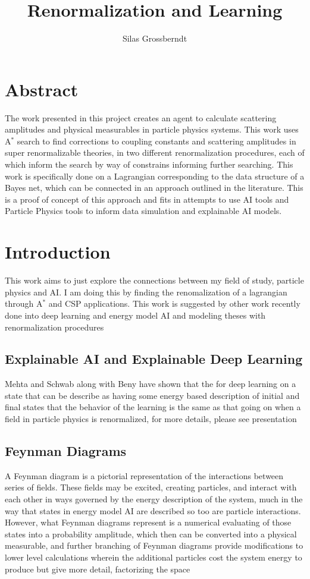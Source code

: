 \documentclass{article}
\author{Silas Grossberndt}
\title{Renormalization and Learning}
\begin{document}
\maketitle
\section*{Abstract}
\hspace{0.5 cm} The work presented in this project creates an agent to calculate scattering amplitudes and physical measurables in particle physics systems. This work uses A$^*$ search to find corrections to coupling constants and scattering amplitudes in super renormalizable theories, in two different renormalization procedures, each of which inform the search by way of constrains informing further searching. This work is specifically done on a Lagrangian corresponding to the data structure of a Bayes net, which can be connected in an approach outlined in the literature. This is a proof of concept of this approach and fits in attempts to use AI tools and Particle Physics tools to inform data simulation and explainable AI models.
\section{Introduction}
This work aims to just explore the connections between my field of study, particle physics and AI. I am doing this by finding the renomalization of a lagrangian through A$^*$ and CSP applications. This work is suggested by other work recently done into deep learning and energy model AI and modeling theses with renormalization procedures
\subsection{Explainable AI and Explainable Deep Learning}
Mehta and Schwab \cite{Mehta2014} along with Beny \cite{Beny2013} have shown that the for deep learning on a state that can be describe as having some energy based description of initial and final states that the behavior of the learning is the same as that going on when a field in particle physics is renormalized, for more details, please see presentation
\subsection{Feynman Diagrams}
A Feynman diagram is a pictorial representation of the interactions between series of fields. These fields may be excited, creating particles, and interact with each other in ways governed by the energy description of the system, much in the way that states in energy model AI are described so too are particle interactions. However, what Feynman diagrams represent is a numerical evaluating of those states into a probability amplitude, which then can be converted into a physical measurable, and further branching of Feynman diagrams provide modifications to lower level calculations wherein the additional particles cost the system energy to produce but give more detail, factorizing the space \cite{PS}
\end{document}

